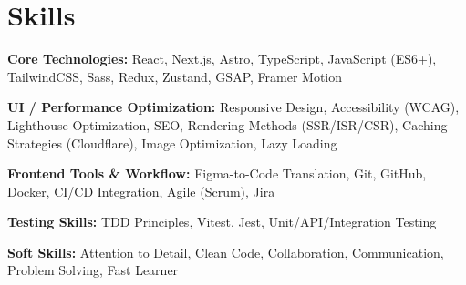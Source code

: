 \section{Skills}

    \begin{onecolentry}
        \textbf{Core Technologies:} React, Next.js, Astro, TypeScript, JavaScript (ES6+), TailwindCSS, Sass, Redux, Zustand, GSAP, Framer Motion
    \end{onecolentry}

    \begin{onecolentry}
        \textbf{UI / Performance Optimization:} Responsive Design, Accessibility (WCAG), Lighthouse Optimization, SEO, Rendering Methods (SSR/ISR/CSR), Caching Strategies (Cloudflare), Image Optimization, Lazy Loading
    \end{onecolentry}

    \begin{onecolentry}
        \textbf{Frontend Tools \& Workflow:} Figma-to-Code Translation, Git, GitHub, Docker, CI/CD Integration, Agile (Scrum), Jira
    \end{onecolentry}

        \begin{onecolentry}
        \textbf{Testing Skills:}  TDD Principles, Vitest, Jest, Unit/API/Integration Testing
    \end{onecolentry}

    \begin{onecolentry}
        \textbf{Soft Skills:} Attention to Detail, Clean Code, Collaboration, Communication, Problem Solving, Fast Learner
    \end{onecolentry}

